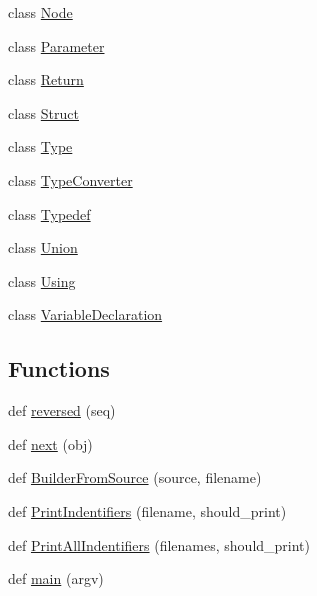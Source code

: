 \begin{DoxyCompactItemize}
class \mbox{\hyperlink{classscripts_1_1generator_1_1cpp_1_1ast_1_1_node}{Node}}
\item 
class \mbox{\hyperlink{classscripts_1_1generator_1_1cpp_1_1ast_1_1_parameter}{Parameter}}
\item 
class \mbox{\hyperlink{classscripts_1_1generator_1_1cpp_1_1ast_1_1_return}{Return}}
\item 
class \mbox{\hyperlink{classscripts_1_1generator_1_1cpp_1_1ast_1_1_struct}{Struct}}
\item 
class \mbox{\hyperlink{classscripts_1_1generator_1_1cpp_1_1ast_1_1_type}{Type}}
\item 
class \mbox{\hyperlink{classscripts_1_1generator_1_1cpp_1_1ast_1_1_type_converter}{Type\+Converter}}
\item 
class \mbox{\hyperlink{classscripts_1_1generator_1_1cpp_1_1ast_1_1_typedef}{Typedef}}
\item 
class \mbox{\hyperlink{classscripts_1_1generator_1_1cpp_1_1ast_1_1_union}{Union}}
\item 
class \mbox{\hyperlink{classscripts_1_1generator_1_1cpp_1_1ast_1_1_using}{Using}}
\item 
class \mbox{\hyperlink{classscripts_1_1generator_1_1cpp_1_1ast_1_1_variable_declaration}{Variable\+Declaration}}
\end{DoxyCompactItemize}
\subsection*{Functions}
\begin{DoxyCompactItemize}
\item 
def \mbox{\hyperlink{namespacescripts_1_1generator_1_1cpp_1_1ast_add1e7c20fd903c40b7dd15e07e737390}{reversed}} (seq)
\item 
def \mbox{\hyperlink{namespacescripts_1_1generator_1_1cpp_1_1ast_a6a50e3014944e6bac6deb829291c988e}{next}} (obj)
\item 
def \mbox{\hyperlink{namespacescripts_1_1generator_1_1cpp_1_1ast_a6249ff8e5c3b3ccbe1f69b3e3b093b84}{Builder\+From\+Source}} (source, filename)
\item 
def \mbox{\hyperlink{namespacescripts_1_1generator_1_1cpp_1_1ast_a5f0475dec5be82258e6ef13b8e81005f}{Print\+Indentifiers}} (filename, should\+\_\+print)
\item 
def \mbox{\hyperlink{namespacescripts_1_1generator_1_1cpp_1_1ast_a80e2ba421a8cd55d9bd9d19aef9242f8}{Print\+All\+Indentifiers}} (filenames, should\+\_\+print)
\item 
def \mbox{\hyperlink{namespacescripts_1_1generator_1_1cpp_1_1ast_a74242c1ce0cfeae1923bc01e44c25b99}{main}} (argv)
\end{DoxyCompactItemize}
